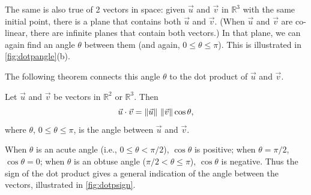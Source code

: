 The same is also true of 2 vectors in space: given $\vec u$ and $\vec v$ in $\mathbb{R}^3$ with the same initial point, there is a plane that contains both $\vec u$ and $\vec v$. (When $\vec u$ and $\vec v$ are co-linear, there are infinite planes that contain both vectors.) In that plane, we can again find an angle $\theta$ between them (and again, $0\leq \theta\leq \pi$). This is illustrated in \autoref{fig:dotpangle}(b).

The following theorem connects this angle $\theta$ to the dot product of $\vec u$ and $\vec v$.

\begin{theorem}\label{thm:dot_product}%
Let $\vec u$ and $\vec v$ be vectors in $\mathbb{R}^2$ or $\mathbb{R}^3$. Then 
\[\vec u\cdot\vec v = \left\lVert \vec u \right\rVert\,\left\lVert \vec v \right\rVert \cos\theta,\]
where $\theta$, $0\leq\theta\leq \pi$, is the angle between $\vec u$ and $\vec v$.
\end{theorem}

When $\theta$ is an acute angle (i.e., $0\leq \theta <\pi/2$), $\cos \theta$ is positive; when $\theta = \pi/2$, $\cos \theta = 0$; when $\theta$ is an obtuse angle ($\pi/2<\theta \leq \pi$), $\cos \theta$ is negative. Thus the sign of the dot product gives a general indication of the angle between the vectors, illustrated in \autoref{fig:dotpsign}.

